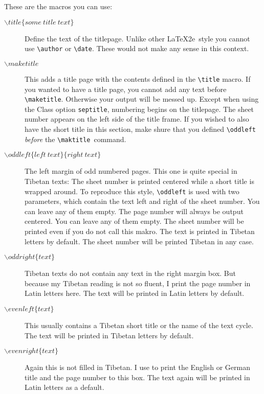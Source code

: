 \documentclass[a4paper,11pt]{article}
\begin{document}
These are the macros you can use:
\begin{description}

\item[$\backslash title\{some\ title\ text\}$] Define the text of the titlepage. Unlike other \LaTeX2e~style you cannot use \verb-\author- or \verb-\date-. These would not make any sense in this context.

\item[$\backslash maketitle$] This adds a title page with the contents defined in the \verb-\title- macro. If you wanted to have a title page, you cannot add any text before \verb-\maketitle-. Otherwise your output will be messed up. Except when using the Class option \verb-septitle-, numbering begins on the titlepage. The sheet number appears on the left side of the title frame. If you wished to also have the short title in this section, make shure that you defined \verb-\oddleft- \emph{before} the \verb-\maktitle-\ command.

\item[$\backslash oddleft\{left\ text\}\{right\ text\}$] The left margin of odd numbered pages. This one is quite special in Tibetan texts: The sheet number is printed centered while a short title is wrapped around. To reproduce this style, \verb-\oddleft- is used with two parameters, which contain the text left and right of the sheet number. You can leave any of them empty.  The page number will always be output centered. You can leave any of them empty. The sheet number will be printed even if you do not call this makro. The text is printed in Tibetan letters by default. The sheet number will be printed Tibetan in any case.

\item[$\backslash oddright\{text\}$] Tibetan texts do not contain any text in the right margin box. But because my Tibetan reading is not so fluent, I print the page number in Latin letters here. The text will be printed in Latin letters by default.

\item[$\backslash evenleft\{text\}$] This usually contains a Tibetan short title or the name of the text cycle. The text will be printed in Tibetan letters by default.

\item[$\backslash evenright\{text\}$] Again this is not filled in Tibetan.  I use to print the English or German title and the page number to this box. The text again will be printed in Latin letters as a default.


\end{description}
\end{document}
